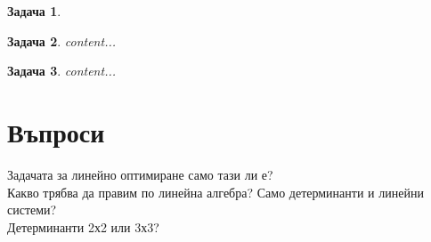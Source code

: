 \documentclass{article}
\newtheorem{problem}{Задача}
\begin{document}
	
	
	
	
	
	
	
	
	
	
	
	
	\begin{problem}
		
	\end{problem}
	
		\begin{problem}
		content...
	\end{problem}

		\begin{problem}
		content...
	\end{problem}
	
	\section{Въпроси}
	Задачата за линейно оптимиране само тази ли е? \\
	Какво трябва да правим по линейна алгебра? Само детерминанти и линейни системи?\\
	Детерминанти 2х2 или 3х3?\\
	
	
	
	
	
\end{document}
